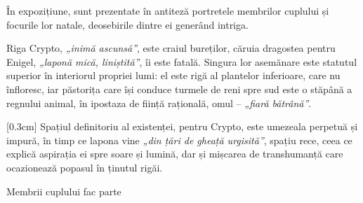 \documentclass[
12pt,                        %
a4paper                      %
]{article}
\begin{document}
În expozițiune, sunt prezentate în antiteză portretele membrilor cuplului și focurile lor natale, deosebirile dintre ei generând intriga.

Riga Crypto, \textit{„inimă ascunsă”}, este craiul bureților, căruia dragostea pentru Enigel, \textit{„laponă mică, liniștită”}, îi este fatală. Singura lor asemănare este statutul superior în interiorul propriei lumi: el este rigă al plantelor inferioare, care nu înfloresc, iar păstorița care își conduce turmele de reni spre sud este o stăpână a regnului animal, în ipostaza de ființă rațională, omul -- \textit{„fiară bătrână”}.

[0.3cm]
Spațiul definitoriu al existenței, pentru Crypto, este umezeala perpetuă și impură, în timp ce lapona vine \textit{„din țări de gheață urgisită”}, spațiu rece, ceea ce explică aspirația ei spre soare și lumină, dar și mișcarea de transhumanță care ocazionează popasul în ținutul rigăi.

Membrii cuplului fac parte
\end{document}
